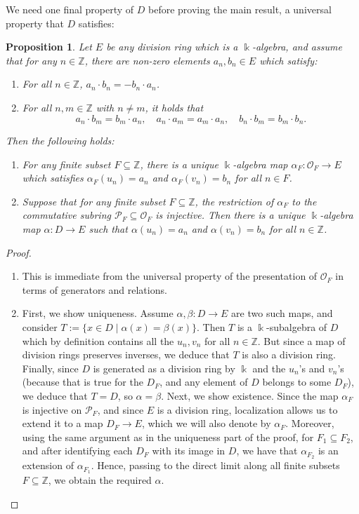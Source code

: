 \documentclass{amsart}
\newtheorem{prop}[equation]{Proposition}
\theoremstyle{definition}
\renewcommand{\k}{\Bbbk}
\numberwithin{equation}{section}
\begin{document}
We need one final property of $D$ before proving the main result,
a universal property that $D$ satisfies:
\begin{prop}\label{prop:univerPropD}
Let $E$ be any division ring which is a $\k$-algebra,
and assume that for any $n \in \mathbb{Z}$,
there are non-zero elements $a_n, b_n \in E$ which satisfy:
\begin{enumerate}
\item For all $n \in \mathbb{Z}$, $a_n \cdot b_n = -b_n \cdot a_n$.
\item For all $n,m \in \mathbb{Z}$ with $n\ne m$,
it holds that
\[
a_n \cdot b_m = b_m \cdot a_n, \quad a_n \cdot a_m = a_m \cdot a_n, \quad b_n \cdot b_m = b_m \cdot b_n.
\]
\end{enumerate}
Then the following holds:
\begin{enumerate}
\item For any finite subset $F \subseteq \mathbb{Z}$,
there is a unique $\k$-algebra map $\alpha_F:\mathcal{O}_F \to E$ which satisfies $\alpha_F(u_n) = a_n$ and $\alpha_F(v_n) = b_n$ for all $n \in F$.
\item Suppose that for any finite subset $F \subseteq \mathbb{Z}$,
the restriction of $\alpha_F$ to the commutative subring $\mathcal{P}_F \subseteq \mathcal{O}_F$ is injective.
Then there is a unique $\k$-algebra map $\alpha:D \to E$ such that $\alpha(u_n) = a_n$ and $\alpha(v_n) = b_n$ for all $n \in \mathbb{Z}$.
\end{enumerate}
\end{prop}
\begin{proof}\quad
\begin{enumerate}
\item This is immediate from the universal property of the presentation of $\mathcal{O}_F$ in terms of generators and relations.
\item First, we show uniqueness.
Assume $\alpha, \beta:D \to E$ are two such maps,
and consider $T := \{x \in D \mid \alpha(x) = \beta(x)\}$.
Then $T$ is a $\k$-subalgebra of $D$ which by definition contains all the $u_n, v_n$ for all $n \in \mathbb{Z}$.
But since a map of division rings preserves inverses,
we deduce that $T$ is also a division ring.
Finally, since $D$ is generated as a division ring by $\k$ and the $u_n$'s and $v_n$'s (because that is true for the $D_F$, and any element of $D$ belongs to some $D_F$), we deduce that $T = D$, so $\alpha = \beta$.
Next, we show existence. 
Since the map $\alpha_F$ is injective on $\mathcal{P}_F$,
and since $E$ is a division ring,
localization allows us to extend it to a map $D_F \to E$,
which we will also denote by $\alpha_F$.
Moreover, using the same argument as in the uniqueness part of the proof,
for $F_1 \subseteq F_2$,
and after identifying each $D_F$ with its image in $D$,
we have that $\alpha_{F_2}$ is an extension of $\alpha_{F_1}$.
Hence, passing to the direct limit along all finite subsets $F \subseteq \mathbb{Z}$,
we obtain the required $\alpha$.
\end{enumerate}    
\end{proof}
\end{document}
